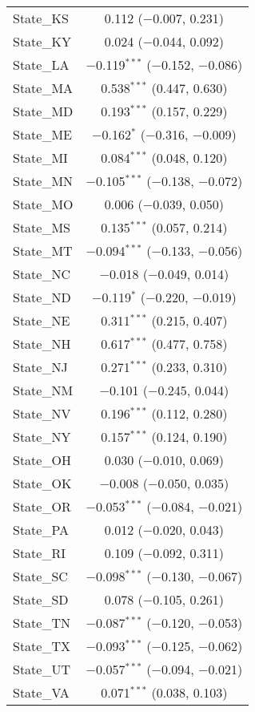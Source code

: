 \begin{table}[!htbp]
\begin{tabular}{@{\extracolsep{5pt}}lc}
  State\_KS & 0.112 ($-$0.007, 0.231) \\ 
  State\_KY & 0.024 ($-$0.044, 0.092) \\ 
  State\_LA & $-$0.119$^{***}$ ($-$0.152, $-$0.086) \\ 
  State\_MA & 0.538$^{***}$ (0.447, 0.630) \\ 
  State\_MD & 0.193$^{***}$ (0.157, 0.229) \\ 
  State\_ME & $-$0.162$^{*}$ ($-$0.316, $-$0.009) \\ 
  State\_MI & 0.084$^{***}$ (0.048, 0.120) \\ 
  State\_MN & $-$0.105$^{***}$ ($-$0.138, $-$0.072) \\ 
  State\_MO & 0.006 ($-$0.039, 0.050) \\ 
  State\_MS & 0.135$^{***}$ (0.057, 0.214) \\ 
  State\_MT & $-$0.094$^{***}$ ($-$0.133, $-$0.056) \\ 
  State\_NC & $-$0.018 ($-$0.049, 0.014) \\ 
  State\_ND & $-$0.119$^{*}$ ($-$0.220, $-$0.019) \\ 
  State\_NE & 0.311$^{***}$ (0.215, 0.407) \\ 
  State\_NH & 0.617$^{***}$ (0.477, 0.758) \\ 
  State\_NJ & 0.271$^{***}$ (0.233, 0.310) \\ 
  State\_NM & $-$0.101 ($-$0.245, 0.044) \\ 
  State\_NV & 0.196$^{***}$ (0.112, 0.280) \\ 
  State\_NY & 0.157$^{***}$ (0.124, 0.190) \\ 
  State\_OH & 0.030 ($-$0.010, 0.069) \\ 
  State\_OK & $-$0.008 ($-$0.050, 0.035) \\ 
  State\_OR & $-$0.053$^{***}$ ($-$0.084, $-$0.021) \\ 
  State\_PA & 0.012 ($-$0.020, 0.043) \\ 
  State\_RI & 0.109 ($-$0.092, 0.311) \\ 
  State\_SC & $-$0.098$^{***}$ ($-$0.130, $-$0.067) \\ 
  State\_SD & 0.078 ($-$0.105, 0.261) \\ 
  State\_TN & $-$0.087$^{***}$ ($-$0.120, $-$0.053) \\ 
  State\_TX & $-$0.093$^{***}$ ($-$0.125, $-$0.062) \\ 
  State\_UT & $-$0.057$^{***}$ ($-$0.094, $-$0.021) \\ 
  State\_VA & 0.071$^{***}$ (0.038, 0.103) \\ 

\end{tabular}
\end{table}

